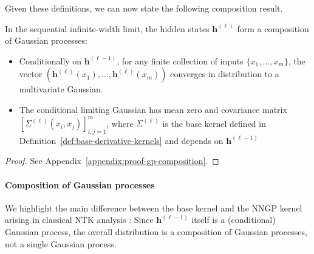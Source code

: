 Given these definitions, we can now state the following composition result.
\begin{theorem}\label{thm:gp-composition}
\vspace{0.3cm}
    In the sequential infinite-width limit, the hidden states \( \bm{h}^{(\ell)} \) form a composition of Gaussian processes:
\begin{itemize}
    \item Conditionally on \( \bm{h}^{(\ell-1)} \), for any finite collection of inputs \( \{x_1, \dots, x_m\} \), the vector \( (\bm{h}^{(\ell)}(x_1), \dots, \bm{h}^{(\ell)}(x_m)) \) converges in distribution to a multivariate Gaussian.
    \item The conditional limiting Gaussian has mean zero and covariance matrix \( [\Sigma^{(\ell)}(x_i, x_j)]_{i,j=1}^m \), where \( \Sigma^{(\ell)} \) is the base kernel defined in Definition~\ref{def:base-derivative-kernels} and depends on \( \bm{h}^{(\ell-1)} \)
\end{itemize}
\end{theorem}
\begin{proof}
See Appendix~\ref{appendix:proof-gp-composition}.
\end{proof}


\paragraph{Composition of Gaussian processes} We highlight the main difference between the base kernel and the NNGP kernel arising in classical NTK analysis : Since \( \bm{h}^{(\ell-1)} \) itself is a (conditional) Gaussian process, the overall distribution is a composition of Gaussian processes, not a single Gaussian process.

